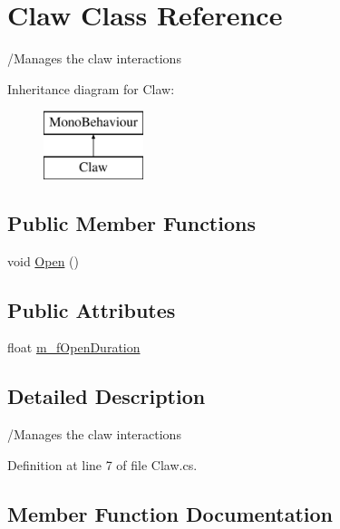 \hypertarget{class_claw}{}\section{Claw Class Reference}
\label{class_claw}


/\+Manages the claw interactions  


Inheritance diagram for Claw\+:\begin{figure}[H]
\begin{center}
\leavevmode
\includegraphics[height=2.000000cm]{class_claw}
\end{center}
\end{figure}
\subsection*{Public Member Functions}
\begin{DoxyCompactItemize}
\item 
void \mbox{\hyperlink{class_claw_aa3a0c581060c7a20b78b199fcdbaba94}{Open}} ()
\end{DoxyCompactItemize}
\subsection*{Public Attributes}
\begin{DoxyCompactItemize}
\item 
float \mbox{\hyperlink{class_claw_a0a052f90ac57ead7e8b56b6fe73bd482}{m\+\_\+f\+Open\+Duration}}
\end{DoxyCompactItemize}


\subsection{Detailed Description}
/\+Manages the claw interactions 



Definition at line 7 of file Claw.\+cs.



\subsection{Member Function Documentation}
\mbox{\label{class_claw_aa3a0c581060c7a20b78b199fcdbaba94}} 
